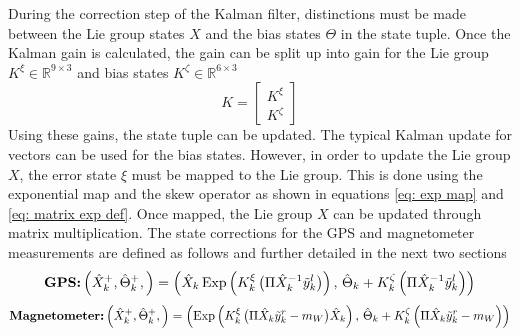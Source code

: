 During the correction step of the Kalman filter, distinctions must be made between the Lie group states $X$ and the bias states $\Theta$ in the state tuple. Once the Kalman gain is calculated, the gain can be split up into gain for the Lie group $K^{\xi} \in \mathbb{R}^{9 \times 3}$ and bias states $K^{\zeta} \in \mathbb{R}^{6 \times 3}$
\begin{equation}
    K = \begin{bmatrix}
        K^{\xi} \\
        K^{\zeta}
    \end{bmatrix}
    \label{eq: Kalman gain for LInEKF}
\end{equation}
Using these gains, the state tuple can be updated. The typical Kalman update for vectors can be used for the bias states. However, in order to update the Lie group $X$, the error state $\xi$ must be mapped to the Lie group. This is done using the exponential map and the skew operator as shown in equations \eqref{eq: exp map} and \eqref{eq: matrix exp def}. Once mapped, the Lie group $X$ can be updated through matrix multiplication. The state corrections for the GPS and magnetometer measurements are defined as follows and further detailed in the next two sections
\begin{equation}
    \textbf{GPS:} \left( \hat{X}_k^+, \hat{\Theta}_k^+, \right) = 
    \left( \hat{X}_k \, \text{Exp} \left( K^{\xi}_k \, \big(\Pi \hat{X}_k^{-1} \Tilde{y}_{k}^l \big) \right), 
    \, \hat{\Theta}_k + K_k^{\zeta} \left( \Pi \hat{X}_k^{-1} \Tilde{y}_{k}^l  \right) \right)
    \label{eq: gps state tuple correction update}
\end{equation}
\begin{equation}
    \textbf{Magnetometer:}\left( \hat{X}_k^+, \hat{\Theta}_k^+, \right) = 
    \left(  \text{Exp} \left( K^{\xi}_k \, \big(\Pi \hat{X}_k \Tilde{y}_{k}^r - m_W \big) \hat{X}_k \right), 
    \, \hat{\Theta}_k + K_k^{\zeta} \left(\Pi \hat{X}_k \Tilde{y}_{k}^r - m_W \right) \right)
    \label{eq: mag state tuple correction update}
\end{equation}

